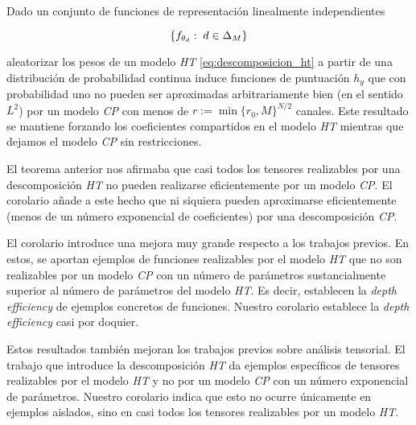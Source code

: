 \begin{corolario} \label{corol:corol_principal}

    Dado un conjunto de funciones de representación linealmente independientes

    \begin{equation}
        \{ f_{\theta_d}: \; d \in \Delta_{M} \}
    \end{equation}

     aleatorizar los pesos de un modelo \textit{HT} \eqref{eq:descomposicion_ht} a partir de una distribución de probabilidad continua induce funciones de puntuación $h_y$ que con probabilidad uno no pueden ser aproximadas arbitrariamente bien (en el sentido $L^2$) por un modelo \textit{CP} con menos de $r := \min \{r_0, M \}^{N/2}$ canales. Este resultado se mantiene forzando los coeficientes compartidos en el modelo \textit{HT} mientras que dejamos el modelo \textit{CP} sin restricciones.

\end{corolario}

El teorema anterior nos afirmaba que casi todos los tensores realizables por una descomposición \textit{HT} no pueden realizarse eficientemente por un modelo \textit{CP}. El corolario añade a este hecho que ni siquiera pueden aproximarse eficientemente (menos de un número exponencial de coeficientes) por una descomposición \textit{CP}.

El corolario  introduce una mejora muy grande respecto a los trabajos previos. En estos, se aportan ejemplos de funciones realizables por el modelo \textit{HT} que no son realizables por un modelo \textit{CP} con un número de parámetros sustancialmente superior al número de parámetros del modelo \textit{HT}. Es decir, establecen la \textit{depth efficiency} de ejemplos concretos de funciones. Nuestro corolario establece la \textit{depth efficiency} casi por doquier.

Estos resultados también mejoran los trabajos previos sobre análisis tensorial. El trabajo que introduce la descomposición \textit{HT} \cite{matematicas:descomposicion_ht} da ejemplos específicos de tensores realizables por el modelo \textit{HT} y no por un modelo \textit{CP} con un número exponencial de parámetros. Nuestro corolario indica que esto no ocurre únicamente en ejemplos aislados, sino en casi todos los tensores realizables por un modelo \textit{HT}.

